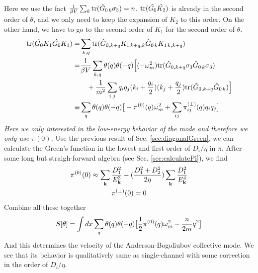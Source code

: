 Here we use the fact $\frac{1}{{\beta{}V}}\sum_{k}\text{tr}(\hat{G}_{0\,k}\sigma_3)=n$. $\text{tr}(\hat{G_{0}}\hat{K_2})$ is already in the second order of $\theta$, and we only need to keep the expansion of $K_2$ to this order. On the other hand, we have to go to the second order of $K_1$ for the second order of $\theta$. 
\begin{align}		
\text{tr}(\hat{G_{0}}{K_1}\hat{G_{0}}{K_1})=&\sum_{k,q}\text{tr}(\hat{G}_{0,k+q}K_{1\,k+q,k}\hat{G}_{0\,k}K_{1\,k,k+q})\\
=&\frac{1}{{\beta{}V}}\sum_{k,q}\theta(q)\theta(-q)\Big[(-\omega_m^2)\text{tr}(\hat{G}_{0,k+q}\sigma_3\hat{G}_{0\,k}\sigma_3)\nonumber\\
&\quad+\frac{1}{m^2}\sum_{i,j}q_iq_j(k_i+\frac{q_i}{2})(k_j+\frac{q_j}{2})\text{tr}(\hat{G}_{0,k+q}\hat{G}_{0\,k})\Big]\nonumber\\
\equiv&\sum_{q}\theta(q)\theta(-q)\big[-\pi^{(0)}(q)\omega_m^2+\sum_{ij}\pi^{(\perp)}_{ij}(q)q_iq_j\big]
\end{align}
\emph{Here we only interested in the low-energy behavior of the mode and therefore we only use $\pi(0)$.} Use the previous result of Sec. \ref{sec:diagonalGreen}, we can calculate the Green's function in the lowest and first order of $D_i/\eta$ in $\pi$.  After some long but straigh-forward algebra (see Sec. \ref{sec:calculatePi}), we find
\begin{gather}
\pi^{(0)}(0)\approx\sum_{\mathbf{k}}\frac{D_{1}^{2}}{E_{\mathbf{k}}^{3}}-(\frac{D_{1}^{2}+D_{2}^{2}}{2\eta})\sum_{\mathbf{k}}\frac{D_{1}^{2}}{E_{\mathbf{k}}^{4}}\\
\pi^{(\perp)}(0)=0
\end{gather}
Combine all these together
\begin{equation}
S[\theta]=\int{dx}\sum_{q}\theta(q)\theta(-q)\big[\frac{1}{2}\pi^{(0)}(q)\omega_m^2-\frac{n}{2m}q^2\big]
\end{equation}
And this determines the velocity of the Anderson-Bogoliubov collective mode.  We see that its behavior is qualitatively same as  single-channel with some correction in the order of $D_{i}/\eta$.



\begin{subappendices}

\end{subappendices}






